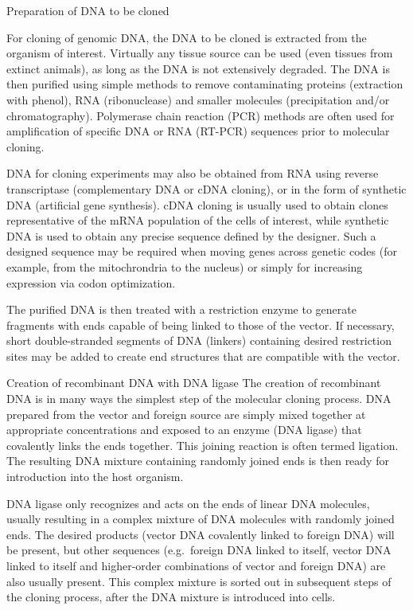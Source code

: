 Preparation of DNA to be cloned

For cloning of genomic DNA, the DNA to be cloned is extracted from the organism of interest. Virtually any tissue source can be used (even tissues from extinct animals), as long as the DNA is not extensively degraded. The DNA is then purified using simple methods to remove contaminating proteins (extraction with phenol), RNA (ribonuclease) and smaller molecules (precipitation and/or chromatography). Polymerase chain reaction (PCR) methods are often used for amplification of specific DNA or RNA (RT-PCR) sequences prior to molecular cloning.

DNA for cloning experiments may also be obtained from RNA using reverse transcriptase (complementary DNA or cDNA cloning), or in the form of synthetic DNA (artificial gene synthesis). cDNA cloning is usually used to obtain clones representative of the mRNA population of the cells of interest, while synthetic DNA is used to obtain any precise sequence defined by the designer. Such a designed sequence may be required when moving genes across genetic codes (for example, from the mitochrondria to the nucleus) or simply for increasing expression via codon optimization.

The purified DNA is then treated with a restriction enzyme to generate fragments with ends capable of being linked to those of the vector. If necessary, short double-stranded segments of DNA (linkers) containing desired restriction sites may be added to create end structures that are compatible with the vector.

Creation of recombinant DNA with DNA ligase
The creation of recombinant DNA is in many ways the simplest step of the molecular cloning process. DNA prepared from the vector and foreign source are simply mixed together at appropriate concentrations and exposed to an enzyme (DNA ligase) that covalently links the ends together. This joining reaction is often termed ligation. The resulting DNA mixture containing randomly joined ends is then ready for introduction into the host organism.

DNA ligase only recognizes and acts on the ends of linear DNA molecules, usually resulting in a complex mixture of DNA molecules with randomly joined ends. The desired products (vector DNA covalently linked to foreign DNA) will be present, but other sequences (e.g.~foreign DNA linked to itself, vector DNA linked to itself and higher-order combinations of vector and foreign DNA) are also usually present. This complex mixture is sorted out in subsequent steps of the cloning process, after the DNA mixture is introduced into cells.

